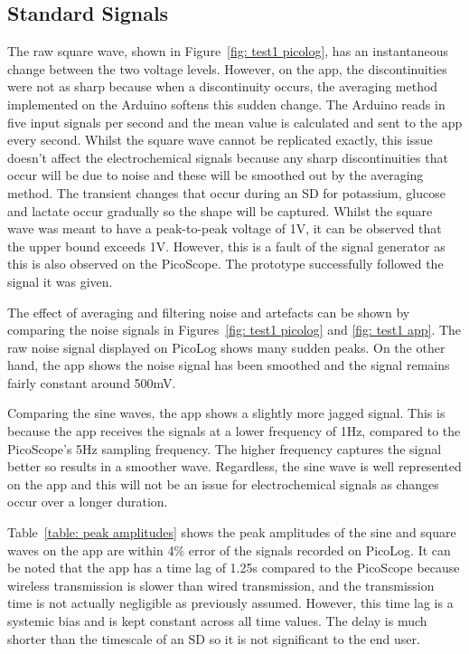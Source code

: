 \subsection{Standard Signals}

The raw square wave, shown in Figure~\ref{fig: test1 picolog}, has an instantaneous change between the two voltage levels. However, on the app, the discontinuities were not as sharp because when a discontinuity occurs, the averaging method implemented on the Arduino softens this sudden change. The Arduino reads in five input signals per second and the mean value is calculated and sent to the app every second. Whilst the square wave cannot be replicated exactly, this issue doesn't affect the electrochemical signals because any sharp discontinuities that occur will be due to noise and these will be smoothed out by the averaging method. The transient changes that occur during an SD for potassium, glucose and lactate occur gradually so the shape will be captured. Whilst the square wave was meant to have a peak-to-peak voltage of 1V, it can be observed that the upper bound exceeds 1V. However, this is a fault of the signal generator as this is also observed on the PicoScope. The prototype successfully followed the signal it was given.

The effect of averaging and filtering noise and artefacts can be shown by comparing the noise signals in Figures~\ref{fig: test1 picolog} and \ref{fig: test1 app}. The raw noise signal displayed on PicoLog shows many sudden peaks. On the other hand, the app shows the noise signal has been smoothed and the signal remains fairly constant around 500mV. 

Comparing the sine waves, the app shows a slightly more jagged signal. This is because the app receives the signals at a lower frequency of 1Hz, compared to the PicoScope's 5Hz sampling frequency. The higher frequency captures the signal better so results in a smoother wave. Regardless, the sine wave is well represented on the app and this will not be an issue for electrochemical signals as changes occur over a longer duration. 

Table~\ref{table: peak amplitudes} shows the peak amplitudes of the sine and square waves on the app are within 4\% error of the signals recorded on PicoLog. It can be noted that the app has a time lag of 1.25s compared to the PicoScope because wireless transmission is slower than wired transmission, and the transmission time is not actually negligible as previously assumed. However, this time lag is a systemic bias and is kept constant across all time values. The delay is much shorter than the timescale of an SD so it is not significant to the end user.

